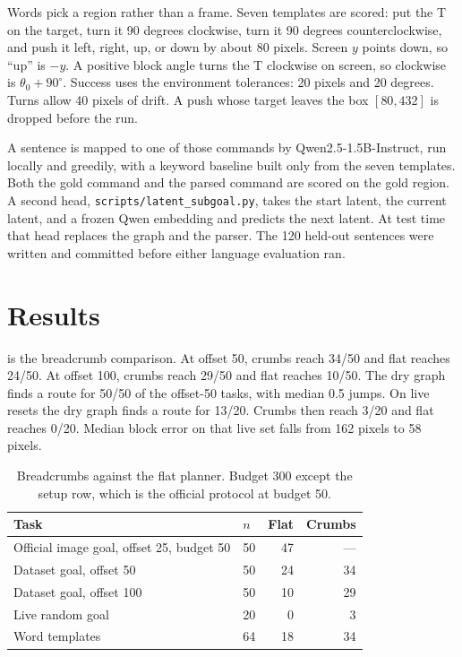 \documentclass[11pt,a4paper]{article}
\begin{document}
Words pick a region rather than a frame.
Seven templates are scored: put the T on the target, turn it 90 degrees clockwise, turn it 90 degrees counterclockwise, and push it left, right, up, or down by about 80 pixels.
Screen $y$ points down, so ``up'' is $-y$.
A positive block angle turns the T clockwise on screen, so clockwise is $\theta_0+90^{\circ}$.
Success uses the environment tolerances: 20 pixels and 20 degrees.
Turns allow 40 pixels of drift.
A push whose target leaves the box $[80,432]$ is dropped before the run.

A sentence is mapped to one of those commands by Qwen2.5-1.5B-Instruct, run locally and greedily, with a keyword baseline built only from the seven templates.
Both the gold command and the parsed command are scored on the gold region.
A second head, \texttt{scripts/latent\_subgoal.py}, takes the start latent, the current latent, and a frozen Qwen embedding and predicts the next latent.
At test time that head replaces the graph and the parser.
The 120 held-out sentences were written and committed before either language evaluation ran.

\section{Results}
 is the breadcrumb comparison.
At offset 50, crumbs reach 34/50 and flat reaches 24/50.
At offset 100, crumbs reach 29/50 and flat reaches 10/50.
The dry graph finds a route for 50/50 of the offset-50 tasks, with median 0.5 jumps.
On live resets the dry graph finds a route for 13/20.
Crumbs then reach 3/20 and flat reaches 0/20.
Median block error on that live set falls from 162 pixels to 58 pixels.

\begin{table}[t]
\centering
\caption{Breadcrumbs against the flat planner. Budget 300 except the setup row, which is the official protocol at budget 50.}
\label{tab:crumbs}
\begin{tabular}{llrr}
\toprule
Task & $n$ & Flat & Crumbs \\
\midrule
Official image goal, offset 25, budget 50 & 50 & 47 & --- \\
Dataset goal, offset 50 & 50 & 24 & 34 \\
Dataset goal, offset 100 & 50 & 10 & 29 \\
Live random goal & 20 & 0 & 3 \\
Word templates & 64 & 18 & 34 \\
\bottomrule
\end{tabular}
\end{table}
\end{document}
